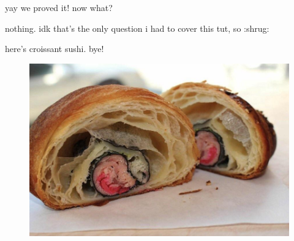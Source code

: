 \documentclass{beamer}
\begin{document}
\begin{frame}{yay we proved it! now what?}

nothing. idk that's the only question i had to cover this tut, so :shrug:

\vspace{2mm}

here's croissant sushi. bye! \emojisushi \emojisushi \emojicroissant \emojicroissant

\begin{figure}[h]
\centering
\includegraphics[scale=0.2]{img/croissant_sushi.png}
\end{figure}

\end{frame}
\end{document}
